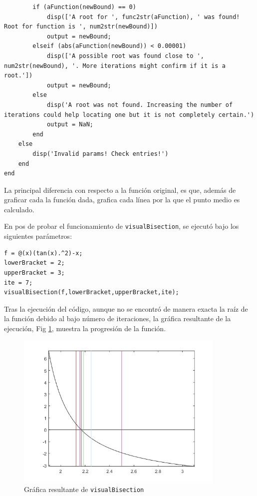 \documentclass[english,notitlepage,letterpaper, 10pt]{article} %
\begin{document}
\begin{enumerate}
\begin{enumerate}
\begin{lstlisting}
        if (aFunction(newBound) == 0)
            disp(['A root for ', func2str(aFunction), ' was found! Root for function is ', num2str(newBound)])
            output = newBound;
        elseif (abs(aFunction(newBound)) < 0.00001)
            disp(['A possible root was found close to ', num2str(newBound), '. More iterations might confirm if it is a root.'])
            output = newBound;
        else
            disp('A root was not found. Increasing the number of iterations could help locating one but it is not completely certain.')
            output = NaN;
        end
    else    
        disp('Invalid params! Check entries!')
    end
end
      \end{lstlisting}

      La principal diferencia con respecto a la función original, es que, además de graficar cada la función dada, grafica cada línea por la que el punto medio es calculado.

      En pos de probar el funcionamiento de \texttt{visualBisection}, se ejecutó bajo los siguientes parámetros:
      
\begin{lstlisting}
f = @(x)(tan(x).^2)-x;
lowerBracket = 2;
upperBracket = 3;
ite = 7;
visualBisection(f,lowerBracket,upperBracket,ite);
\end{lstlisting}

      Tras la ejecución del código, aunque no se encontró de manera exacta la raíz de la función debido al bajo número de iteraciones, la gráfica resultante de la ejecución, Fig \ref{leBisection}, muestra la progresión de la función.

      \begin{figure}[H]
        \centering
        \includegraphics[width=10cm]{Images/leBisection.png}
        \caption{Gráfica resultante de \texttt{visualBisection}}
        \label{leBisection}
      \end{figure}


\end{enumerate}
\end{enumerate}
\end{document}
